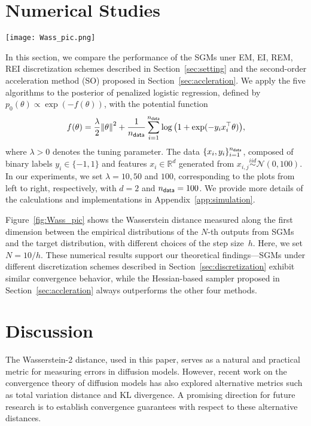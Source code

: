 \documentclass[11pt]{article}
\def\l|{\left\lVert}
\def\r|{\right\rVert}
\begin{document}
\section{Numerical Studies}
\label{sec:simulation}

\begin{figure*}[t]
    \centering
    \texttt{[image: Wass\_pic.png]}
    \caption{Error of various discretization schemes and second-order sampler with different choice of step size.}
    \label{fig:Wass_pic}
\end{figure*}
In this section, we compare the performance of the SGMs uner {\sf EM, EI, REM, REI} discretization schemes described in Section~\ref{sec:setting} and the second-order acceleration method ({\sf SO}) proposed in Section~\ref{sec:accleration}. 
We apply the five algorithms to the posterior of penalized logistic regression, defined by $p_0(\theta)\propto \exp(-f(\theta))$, with the potential function
\begin{align*}
    f(\theta)=\dfrac{\lambda}{2}\l|\theta\r|^2+\dfrac{1}{n_{\sf data}}\sum_{i=1}^{n_{\sf data}}\log\big(1+\exp(-y_ix_i^\top \theta)\big),
\end{align*}
where $\lambda>0$ denotes the tuning parameter. 
The data $\{x_i, y_i\}_{i=1}^{n_{\sf data}}$, composed of binary labels $y_i\in\{-1,1\}$ and features $x_i\in\mathbb{R}^d$ generated from $x_{i,j}\mathop{\sim}\limits^{iid}\mathcal{N}(0,100)$. 
In our experiments, we set $\lambda=10,50$ and $100$, corresponding to the plots from left to right, respectively, with $d=2$ and $n_{\sf data}=100$.
We provide more details of the calculations and implementations in Appendix~\ref{app:simulation}.

Figure~\ref{fig:Wass_pic} shows the Wasserstein distance measured along the first dimension between the empirical distributions of the $N$-th outputs from SGMs and the target distribution, with different choices of the step size~$h$. 
Here, we set $N=10/h$.
These numerical results support our theoretical findings—SGMs under different discretization schemes described in Section~\ref{sec:discretization} exhibit similar convergence behavior, while the Hessian-based sampler proposed in Section~\ref{sec:accleration} always outperforms the other four methods.
 
\section{Discussion}
\label{sec:discussion}
The Wasserstein-2 distance, used in this paper, serves as a natural and practical metric for measuring errors in diffusion models. However, recent work on the convergence theory of diffusion models has also explored alternative metrics such as total variation distance and KL divergence. A promising direction for future research is to establish convergence guarantees with respect to these alternative distances.
\end{document}
